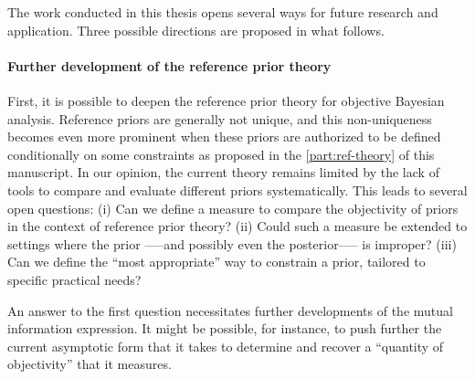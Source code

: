















The work conducted in this thesis opens several ways for future research and application. Three possible directions are proposed in what follows. %



\paragraph{Further development of the reference prior theory}

First, it is possible to deepen the reference prior theory for objective Bayesian analysis. Reference priors are generally not unique, and this non-uniqueness becomes even more prominent when these priors are authorized to be defined conditionally on some constraints as proposed in the \cref{part:ref-theory} of this manuscript. In our opinion, the current theory remains limited by the lack of tools to compare and evaluate different priors systematically. This leads to several open questions:
(i) Can we define a measure to compare the objectivity of priors in the context of reference prior theory? (ii)
Could such a measure be extended to settings where the prior —--and possibly even the posterior—-- is improper? (iii) Can we define the ``most appropriate'' way to constrain a prior, tailored to specific practical needs?

An answer to the first question necessitates further developments of the mutual information expression.
It might be possible, for instance, to push further the current asymptotic form that it takes to determine and
recover a ``quantity of objectivity'' that it measures.

